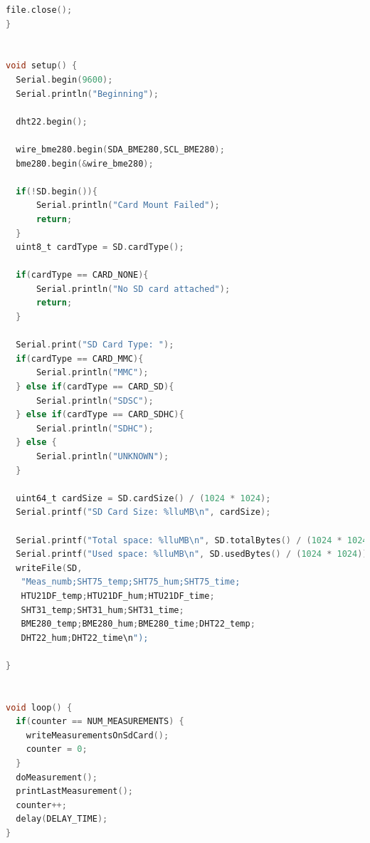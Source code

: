 \documentclass[runningheads]{llncs}
\begin{document}
\begin{lstlisting}[language=C]
    file.close();
}


void setup() {
  Serial.begin(9600);
  Serial.println("Beginning");
  
  dht22.begin();
  
  wire_bme280.begin(SDA_BME280,SCL_BME280);
  bme280.begin(&wire_bme280); 

  if(!SD.begin()){
      Serial.println("Card Mount Failed");
      return;
  }
  uint8_t cardType = SD.cardType();

  if(cardType == CARD_NONE){
      Serial.println("No SD card attached");
      return;
  }

  Serial.print("SD Card Type: ");
  if(cardType == CARD_MMC){
      Serial.println("MMC");
  } else if(cardType == CARD_SD){
      Serial.println("SDSC");
  } else if(cardType == CARD_SDHC){
      Serial.println("SDHC");
  } else {
      Serial.println("UNKNOWN");
  }

  uint64_t cardSize = SD.cardSize() / (1024 * 1024);
  Serial.printf("SD Card Size: %lluMB\n", cardSize);

  Serial.printf("Total space: %lluMB\n", SD.totalBytes() / (1024 * 1024));
  Serial.printf("Used space: %lluMB\n", SD.usedBytes() / (1024 * 1024));
  writeFile(SD, 
   "Meas_numb;SHT75_temp;SHT75_hum;SHT75_time;
   HTU21DF_temp;HTU21DF_hum;HTU21DF_time;
   SHT31_temp;SHT31_hum;SHT31_time;
   BME280_temp;BME280_hum;BME280_time;DHT22_temp;
   DHT22_hum;DHT22_time\n");

}


void loop() {
  if(counter == NUM_MEASUREMENTS) {
    writeMeasurementsOnSdCard();
    counter = 0;
  }
  doMeasurement();
  printLastMeasurement();
  counter++;
  delay(DELAY_TIME);
}

\end{lstlisting}
\end{document}
